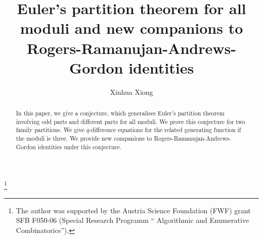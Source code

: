 \documentclass[draft]{amsart}
\numberwithin{equation}{section}
\theoremstyle{plain}
\theoremstyle{remark}
\begin{document}
\makeatletter
\def\imod#1{\allowbreak\mkern10mu({\operator@font mod}\,\,#1)}
\makeatother

\author{Xinhua Xiong}
   \address{Research Institute for Symbolic Computation, Johannes Kepler University, A4040 Linz, Austria}




\title[ Euler's partition theorem]{\hspace{0.0cm}  Euler's partition theorem for all moduli and new companions to Rogers-Ramanujan-Andrews-Gordon identities}

\thanks{The  author was  supported  by the Austria Science Foundation (FWF) grant SFB F050-06 (Special Research Programm `` Algorithmic and Enumerative Combinatorics'').}    

\dedicatory{}     

\begin{abstract}  
In this paper, we give a conjecture, which generalises Euler's partition theorem involving odd parts and different parts for all moduli.  We prove this conjecture for two family partitions. We give $q$-difference equations for the related generating function if the moduli is three. We provide new companions to Rogers-Ramanujan-Andrews-Gordon identities under this conjecture.
\end{abstract}   
   
 
 
 

   
\maketitle
\end{document}
